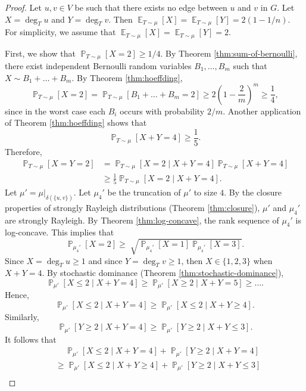 \documentclass[letterpaper, reqno,12pt]{article}
\newcommand{\PP}{\mathop{{}\mathbb{P}}}
\newcommand{\EE}{\mathop{{}\mathbb{E}}}
\begin{document}
\begin{proof}
  Let $u, v \in V$ be such that there exists no edge between $u$ and $v$ in $G$. Let $X = \deg_T u$ and $Y = \deg_T v$. Then $\EE_{T \sim \mu}[X] = \EE_{T \sim \mu}[Y] = 2(1 - 1/n)$. For simplicity, we assume that $\EE_{T \sim \mu}[X] = \EE_{T \sim \mu}[Y] = 2$.

  First, we show that $\PP_{T \sim \mu}[X = 2] \geq 1/4$. By Theorem \ref{thm:sum-of-bernoulli}, there exist independent Bernoulli random variables $B_1, \ldots, B_m$ such that $X \sim B_1 + \ldots + B_m$. By Theorem \ref{thm:hoeffding},
  $$ \PP_{T \sim \mu}[X = 2] = \PP_{T \sim \mu}\left[B_1 + \ldots + B_m = 2\right] \geq 2\left(1 - \frac{2}{m}\right)^m \geq \frac{1}{4}, $$
  since in the worst case each $B_i$ occurs with probability $2/m$. Another application of Theorem \ref{thm:hoeffding} shows that
  $$ \PP_{T \sim \mu}[X + Y = 4] \geq \frac{1}{5}. $$
  Therefore,
  \begin{align*}
    \PP_{T \sim \mu}[X = Y = 2] &= \PP_{T \sim \mu}[X = 2 \mid X + Y = 4] \PP_{T \sim \mu}[X + Y = 4] \\
    &\geq \frac{1}{5} \PP_{T \sim \mu}[X = 2 \mid X + Y = 4].
  \end{align*}
  Let $\mu' = \mu|_{\delta(\{ u, v \})}$. Let $\mu_4'$ be the truncation of $\mu'$ to size $4$. By the closure properties of strongly Rayleigh distributions (Theorem \ref{thm:closure}), $\mu'$ and $\mu_4'$ are strongly Rayleigh. By Theorem \ref{thm:log-concave}, the rank sequence of $\mu_4'$ is log-concave. This implies that
  \begin{equation} \label{eq:log-concave}
    \PP_{\mu_4'}[X = 2] \geq \sqrt[]{\PP_{\mu_4'}[X = 1] \PP_{\mu_4'}[X = 3]}.
  \end{equation}
  Since $X = \deg_T u \geq 1$ and since $Y = \deg_T v \geq 1$, then $X \in \{ 1, 2, 3 \}$ when $X + Y = 4$. By stochastic dominance (Theorem \ref{thm:stochastic-dominance}),
  $$ \PP_{\mu'}[X \leq 2 \mid X + Y = 4] \geq \PP_{\mu'}[X \geq 2 \mid X + Y = 5] \geq \ldots. $$
  Hence,
  $$ \PP_{\mu'}[X \leq 2 \mid X + Y = 4] \geq \PP_{\mu'}[X \leq 2 \mid X + Y \geq 4]. $$
  Similarly,
  $$ \PP_{\mu'}[Y \geq 2 \mid X + Y = 4] \geq \PP_{\mu'}[Y \geq 2 \mid X + Y \leq 3]. $$
  It follows that
  \begin{align}
    &\quad\, \PP_{\mu'}[X \leq 2 \mid X + Y = 4] + \PP_{\mu'}[Y \geq 2 \mid X + Y = 4] \nonumber \\
    &\geq \PP_{\mu'}[X \leq 2 \mid X + Y \geq 4] + \PP_{\mu'}[Y \geq 2 \mid X + Y \leq 3] \nonumber \\

\end{align}
\end{proof}
\end{document}
